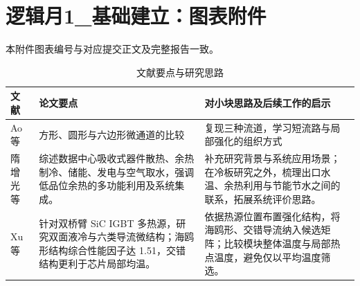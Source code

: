 \documentclass[stage1,fontset=fandol]{ydzjreport}
\begin{document}
\section*{逻辑月1\_基础建立：图表附件}
本附件图表编号与对应提交正文及完整报告一致。\par\clearpage
\setcounter{table}{0}
\begin{table}[H]
	  \centering
	  \small
	  \renewcommand{\arraystretch}{1.12}
	  \caption{文献要点与研究思路}
	  \label{tab:notes}
	  \begin{tabularx}{\textwidth}{@{}>{\RaggedRight\arraybackslash}p{} Y Y@{}}
	    \toprule
{} 文献 & 论文要点 & 对小块思路及后续工作的启示 \\
	    \midrule
	    Ao 等\cite{ao} & 方形、圆形与六边形微通道的比较 & 复现三种流道，学习短流路与局部强化的组织方式 \\[3pt]
	    隋增光等\cite{ref1} & 综述数据中心吸收式器件散热、余热制冷、储能、发电与空气取水，强调低品位余热的多功能利用及系统集成。 & 补充研究背景与系统应用场景；在冷板研究之外，梳理出口水温、余热利用与节能节水之间的联系，拓展系统评价思路。 \\[3pt]
	    Xu 等\cite{ref2} & 针对双桥臂 SiC IGBT 多热源，研究双面液冷与六类导流微结构；海鸥形结构综合性能因子达 1.51，交错结构更利于芯片局部均温。 & 依据热源位置布置强化结构，将海鸥形、交错导流纳入候选矩阵；比较模块整体温度与局部热点温度，避免仅以平均温度筛选。 \\[3pt]

	    \bottomrule
	  \end{tabularx}
	\end{table}
\clearpage
\setcounter{table}{1}
\end{document}
